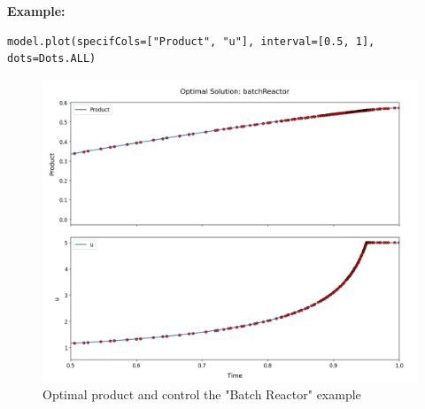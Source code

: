 \documentclass[12pt]{article}
\begin{document}
\begin{mdframed}[backgroundcolor=gray!10, roundcorner=10pt,
		linewidth=1pt]
			\textbf{Example:} 	\begin{lstlisting}
model.plot(specifCols=["Product", "u"], interval=[0.5, 1], dots=Dots.ALL)
					\end{lstlisting}
\begin{figure}[H]
	\centering
	\includegraphics[width=1\textwidth]{images/plotstd.png}
	\caption{Optimal product and control the "Batch Reactor" example}
	\label{fig:batch}
\end{figure}
	
\end{mdframed}
\end{document}
